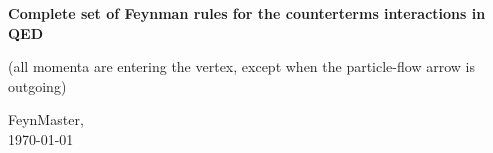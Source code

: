 \documentclass[a4paper,12pt,twoside]{report}
\begin{document}
 
 
\begin{center} 
\textbf{\large \color{dgreen} Complete set of Feynman rules for the counterterms interactions in QED}

\vspace{1mm}

{\footnotesize \color{gray} (all momenta are entering the vertex, except when the particle-flow arrow is outgoing)}

\vspace{2mm}

\end{center}

\vspace{1cm}
\raggedright
FeynMaster,\\[1mm]
\today 
\end{document}
